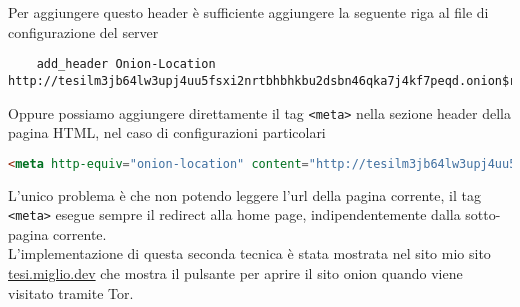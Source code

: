Per aggiungere questo header è sufficiente aggiungere la seguente riga al file di configurazione del server
\begin{lstlisting}
    add_header Onion-Location http://tesilm3jb64lw3upj4uu5fsxi2nrtbhbhkbu2dsbn46qka7j4kf7peqd.onion$request_uri;
\end{lstlisting}
Oppure possiamo aggiungere direttamente il tag \lstinline{<meta>} nella sezione header della pagina HTML, nel caso di configurazioni particolari 
\begin{lstlisting}[language=HTML]
    <meta http-equiv="onion-location" content="http://tesilm3jb64lw3upj4uu5fsxi2nrtbhbhkbu2dsbn46qka7j4kf7peqd.onion" />
\end{lstlisting}
L'unico problema è che non potendo leggere l'url della pagina corrente, il tag \lstinline{<meta>} esegue sempre il redirect alla home page, indipendentemente dalla sotto-pagina corrente. \\
L'implementazione di questa seconda tecnica è stata mostrata nel sito mio sito \url{tesi.miglio.dev} che mostra il pulsante per aprire il sito onion quando viene visitato tramite Tor. \\
\cite{OnionLocationHeader} \\

